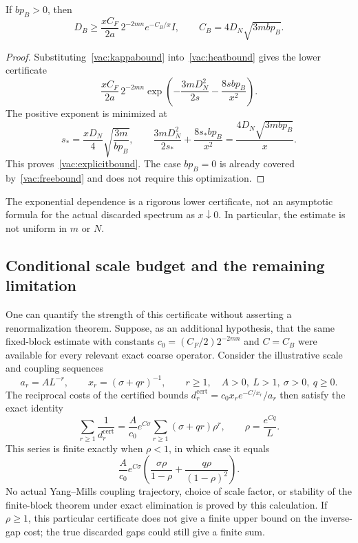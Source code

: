 \begin{corollary}
\label{vac:exponential}
If $bp_B>0$, then
\begin{equation}
 D_B\geq\frac{xC_F}{2a}\,2^{-2mn}
                   e^{-C_B/x}I,
 \qquad C_B=4D_N\sqrt{3mbp_B}.
 \label{vac:explicitbound}
\end{equation}
\end{corollary}

\begin{proof}
Substituting~\eqref{vac:kappabound} into~\eqref{vac:heatbound} gives the
lower certificate
\[
 \frac{xC_F}{2a}\,2^{-2mn}
 \exp\!\left(-\frac{3mD_N^2}{2s}-\frac{8sbp_B}{x^2}\right).
\]
The positive exponent is minimized at
\[
 s_* =\frac{xD_N}{4}\sqrt{\frac{3m}{bp_B}},
 \qquad
 \frac{3mD_N^2}{2s_*}+\frac{8s_*bp_B}{x^2}
       =\frac{4D_N\sqrt{3mbp_B}}{x}.
\]
This proves~\eqref{vac:explicitbound}.  The case $bp_B=0$ is already covered
by~\eqref{vac:freebound} and does not require this optimization.
\end{proof}

The exponential dependence is a rigorous lower certificate, not an
asymptotic formula for the actual discarded spectrum as $x\downarrow0$.
In particular, the estimate is not uniform in $m$ or $N$.

\subsection{Conditional scale budget and the remaining limitation}
\label{vac:budget}

One can quantify the strength of this certificate without asserting a
renormalization theorem.  Suppose, as an additional hypothesis, that the same
fixed-block estimate with constants
$c_0=(C_F/2)2^{-2mn}$ and $C=C_B$ were available for every relevant exact
coarse operator.  Consider the illustrative scale and coupling sequences
\begin{equation}
 a_r=A L^{-r},\qquad x_r=(\sigma+qr)^{-1},\qquad r\geq1,
 \quad A>0,\ L>1,\ \sigma>0,\ q\geq0.
 \label{vac:modelscales}
\end{equation}
The reciprocal costs of the certified bounds
$d_r^{\mathrm{cert}}=c_0x_r e^{-C/x_r}/a_r$ then satisfy the exact identity
\begin{equation}
 \sum_{r\geq1}\frac1{d_r^{\mathrm{cert}}}
 =\frac{A}{c_0}e^{C\sigma}
       \sum_{r\geq1}(\sigma+qr)\rho^r,
 \qquad \rho=\frac{e^{Cq}}{L}.
 \label{vac:budgetseries}
\end{equation}
This series is finite exactly when $\rho<1$, in which case it equals
\begin{equation}
 \frac{A}{c_0}e^{C\sigma}
 \left(\frac{\sigma\rho}{1-\rho}
       +\frac{q\rho}{(1-\rho)^2}\right).
 \label{vac:budgetvalue}
\end{equation}
No actual Yang--Mills coupling trajectory, choice of scale factor, or
stability of the finite-block theorem under exact elimination is proved by
this calculation.  If $\rho\geq1$, this particular certificate does not
give a finite upper bound on the inverse-gap cost; the true discarded gaps
could still give a finite sum.

